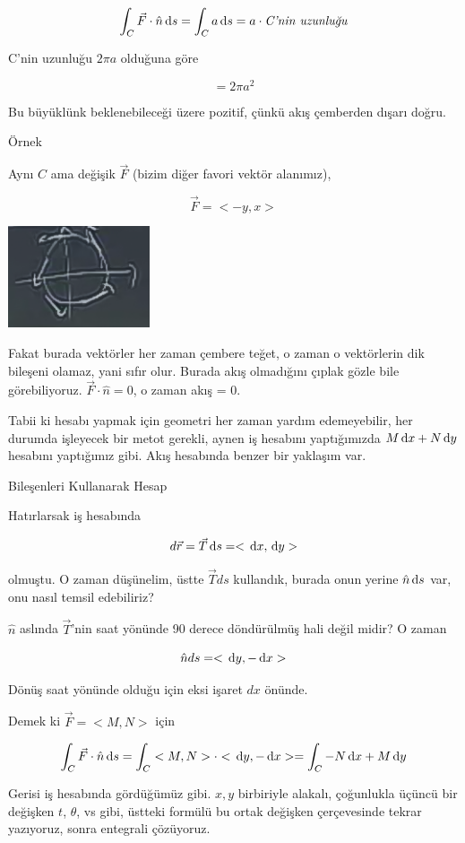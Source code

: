 \documentclass[12pt,fleqn]{article}\usepackage{../../common}
\begin{document}
$$ \int_C \vec{F} \cdot \hat{n} \,\mathrm{d} s 
= \int_C a \,\mathrm{d} s  = a \cdot \textit{C'nin uzunluğu}
$$

C'nin uzunluğu $2\pi a$ olduğuna göre

$$ = 2\pi a^2 $$

Bu büyüklünk beklenebileceği üzere pozitif, çünkü akış çemberden dışarı
doğru. 

Örnek

Aynı $C$ ama değişik $\vec{F}$ (bizim diğer favori vektör alanımız), 

$$ \vec{F} = < -y,x > $$

\includegraphics[height=3cm]{23_7.png}

Fakat burada vektörler her zaman çembere teğet, o zaman o vektörlerin dik
bileşeni olamaz, yani sıfır olur. Burada akış olmadığını çıplak gözle bile
görebiliyoruz. $\vec{F} \cdot \hat{n} = 0$, o zaman akış = 0. 

Tabii ki hesabı yapmak için geometri her zaman yardım edemeyebilir, her durumda
işleyecek bir metot gerekli, aynen iş hesabını yaptığımızda $M \,\mathrm{d} x + N \,\mathrm{d} y$
hesabını yaptığımız gibi. Akış hesabında benzer bir yaklaşım var.

Bileşenleri Kullanarak Hesap

Hatırlarsak iş hesabında 

$$ d\vec{r} = \vec{T} \,\mathrm{d} s = < \,\mathrm{d} x, \,\mathrm{d} y > $$

olmuştu. O zaman düşünelim, üstte $\vec{T} ds$ kullandık, burada onun
yerine $\hat{n} \,\mathrm{d} s$ var, onu nasıl temsil edebiliriz? 

$\hat{n}$ aslında $\vec{T}$'nin saat yönünde 90 derece döndürülmüş hali
değil midir? O zaman 

$$ \hat{n}ds = < \,\mathrm{d} y,-\,\mathrm{d} x > $$

Dönüş saat yönünde olduğu için eksi işaret $dx$ önünde. 

Demek ki $\vec{F} = < M,N >$ için

$$
\int_C \vec{F} \cdot \hat{n} \,\mathrm{d} s =
\int_C  < M,N > \cdot < \,\mathrm{d} y,-\,\mathrm{d} x > =  \int_C -N \,\mathrm{d} x + M \,\mathrm{d} y
$$

Gerisi iş hesabında gördüğümüz gibi. $x,y$ birbiriyle alakalı, çoğunlukla
üçüncü bir değişken $t$, $\theta$, vs gibi, üstteki formülü bu ortak
değişken çerçevesinde tekrar yazıyoruz, sonra entegrali çözüyoruz. 
\end{document}
